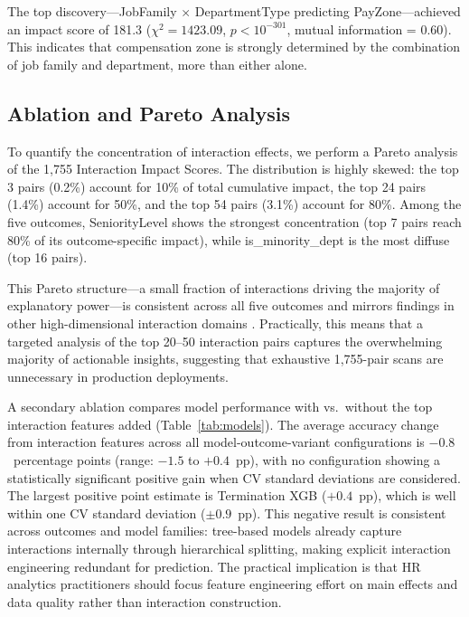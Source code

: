 \documentclass[twocolumn]{article}
\begin{document}
The top discovery---JobFamily $\times$ DepartmentType predicting PayZone---achieved an impact score of 181.3 ($\chi^2 = 1423.09$, $p < 10^{-301}$, mutual information = 0.60). This indicates that compensation zone is strongly determined by the combination of job family and department, more than either alone.

\subsection{Ablation and Pareto Analysis}

To quantify the concentration of interaction effects, we perform a Pareto analysis of the 1,755 Interaction Impact Scores. The distribution is highly skewed: the top 3 pairs (0.2\%) account for 10\% of total cumulative impact, the top 24 pairs (1.4\%) account for 50\%, and the top 54 pairs (3.1\%) account for 80\%. Among the five outcomes, SeniorityLevel shows the strongest concentration (top 7 pairs reach 80\% of its outcome-specific impact), while is\_minority\_dept is the most diffuse (top 16 pairs).

This Pareto structure---a small fraction of interactions driving the majority of explanatory power---is consistent across all five outcomes and mirrors findings in other high-dimensional interaction domains \cite{sorokina2008detecting}. Practically, this means that a targeted analysis of the top 20--50 interaction pairs captures the overwhelming majority of actionable insights, suggesting that exhaustive 1,755-pair scans are unnecessary in production deployments.

A secondary ablation compares model performance with vs.\ without the top interaction features added (Table~\ref{tab:models}). The average accuracy change from interaction features across all model-outcome-variant configurations is $-0.8$~percentage points (range: $-1.5$ to $+0.4$~pp), with no configuration showing a statistically significant positive gain when CV standard deviations are considered. The largest positive point estimate is Termination XGB ($+0.4$~pp), which is well within one CV standard deviation ($\pm0.9$~pp). This negative result is consistent across outcomes and model families: tree-based models already capture interactions internally through hierarchical splitting, making explicit interaction engineering redundant for prediction. The practical implication is that HR analytics practitioners should focus feature engineering effort on main effects and data quality rather than interaction construction.
\end{document}
